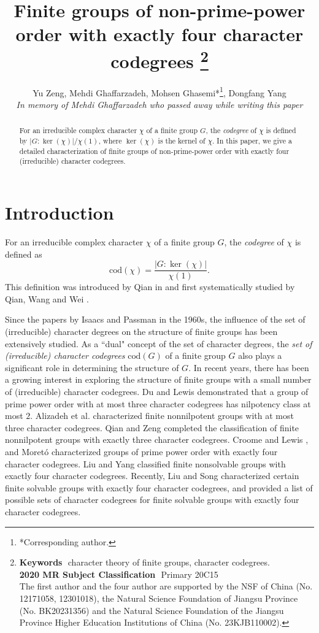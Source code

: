 \documentclass[9pt]{article}
\title{Finite groups of non-prime-power order with exactly four character codegrees
\thanks{\textbf{Keywords}\,\, character theory of finite groups, character codegrees.\\
\textbf{2020 MR Subject Classification}\,\, Primary 20C15\\
The first author and the four author are supported by the NSF of China (No. 12171058, 12301018), the Natural Science Foundation of Jiangsu Province (No. BK20231356) and the Natural Science Foundation of the Jiangsu Province Higher Education Institutions of China (No. 23KJB110002).
}}
\author{Yu Zeng, Mehdi Ghaffarzadeh, Mohsen Ghasemi*\thanks{*Corresponding author.}, Dongfang Yang\\
\small{\emph{In memory of Mehdi Ghaffarzadeh who passed away while writing this paper}}
}
\date{}
\begin{document}
\maketitle




\begin{abstract}
For an irreducible complex character $\chi$ of a finite group $G$, the \emph{codegree} of $\chi$ is defined by $|G:\ker(\chi)|/\chi(1)$, where $\ker(\chi)$ is the kernel of $\chi$.
In this paper, we 
give a detailed characterization of finite groups of non-prime-power order 
with exactly four (irreducible) character codegrees.
\end{abstract}




\section{Introduction}






For an irreducible complex character $\chi$ of a finite group $G$,
the \emph{codegree} of $\chi$ is defined as
$$\mathrm{cod}(\chi) =\frac{|G: \ker(\chi)|}{\chi(1)}.$$
This definition was introduced by Qian in \cite{qian2002}
and first systematically studied by Qian, Wang and Wei \cite{qian2007}.

Since the papers by Isaacs and Passman in the 1960s, the influence of the set of (irreducible) character degrees
on the structure of finite groups has been extensively studied.
As a ``dual" concept of the set of character degrees,
the \emph{set of (irreducible) character codegrees} $\mathrm{cod}(G)$ of a finite group $G$ also plays a significant role in
determining the structure of $G$.
In recent years, there has been a growing interest in exploring the structure of finite groups 
with a small number of (irreducible) character codegrees.
Du and Lewis \cite{du2016} demonstrated that a group of prime power order
 with at most three character codegrees has nilpotency class at most $2$.
Alizadeh et al. \cite{alizadeh2019} characterized finite nonnilpotent groups with at most three character codegrees.
Qian and Zeng \cite{qian2023} completed the classification of finite nonnilpotent groups with exactly three character codegrees.
Croome and Lewis \cite{croome2020}, and Moret\'o \cite{moreto2022} characterized groups of prime power order with exactly four character codegrees.
Liu and Yang \cite{liu2021} classified finite nonsolvable groups with exactly four character codegrees.
Recently, Liu and Song \cite{liu2025} characterized certain finite solvable groups with exactly four character codegrees,
and provided a list of possible sets of character codegrees for finite solvable groups 
with exactly four character codegrees.
\end{document}
